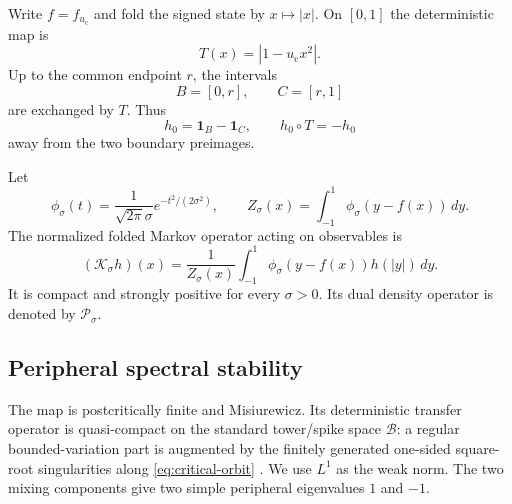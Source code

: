 \documentclass[11pt]{article}
\theoremstyle{definition}
\theoremstyle{remark}
\newcommand{\uc}{u_{\mathrm c}}
\newcommand{\cK}{\mathcal K}
\newcommand{\cP}{\mathcal P}
\begin{document}
Write $f=f_{\uc}$ and fold the signed state by $x\mapsto|x|$.  On $[0,1]$
the deterministic map is
\begin{equation}\label{eq:folded-map}
 T(x)=|1-\uc x^2|.
\end{equation}
Up to the common endpoint $r$, the intervals
\begin{equation}\label{eq:components}
 B=[0,r],
 \qquad
 C=[r,1]
\end{equation}
are exchanged by $T$.  Thus
\begin{equation}\label{eq:hard-parity}
 h_0=\mathbf1_B-\mathbf1_C,
 \qquad
 h_0\circ T=-h_0
\end{equation}
away from the two boundary preimages.

Let
\begin{equation}\label{eq:gaussian}
 \phi_\sigma(t)=\frac1{\sqrt{2\pi}\sigma}
 e^{-t^2/(2\sigma^2)},
 \qquad
 Z_\sigma(x)=\int_{-1}^1\phi_\sigma(y-f(x))\,dy.
\end{equation}
The normalized folded Markov operator acting on observables is
\begin{equation}\label{eq:markov-operator}
 (\cK_\sigma h)(x)
 =\frac1{Z_\sigma(x)}
 \int_{-1}^1\phi_\sigma(y-f(x))h(|y|)\,dy.
\end{equation}
It is compact and strongly positive for every $\sigma>0$.  Its dual density
operator is denoted by $\cP_\sigma$.

\subsection{Peripheral spectral stability}

The map is postcritically finite and Misiurewicz.  Its deterministic transfer
operator is quasi-compact on the standard tower/spike space $\mathcal B$: a
regular bounded-variation part is augmented by the finitely generated
one-sided square-root singularities along \eqref{eq:critical-orbit}
\citep{Misiurewicz1981,KellerNowicki1992,Baladi2000}.  We use $L^1$ as the
weak norm.  The two mixing components give two simple peripheral eigenvalues
$1$ and $-1$.
\end{document}
